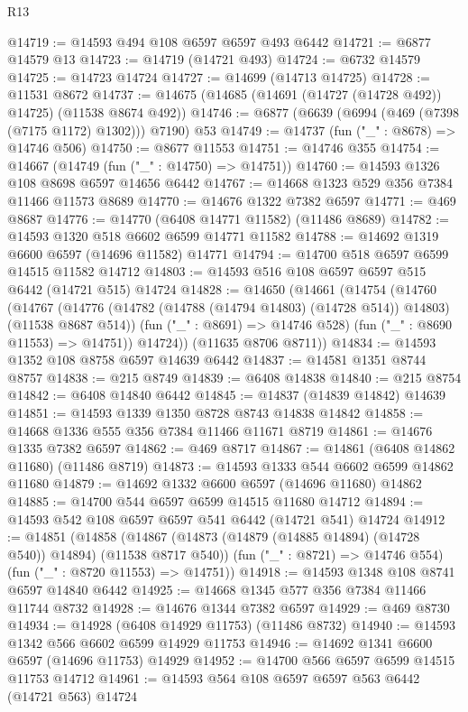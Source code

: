 \begin{lexlean}{R13}
\begin{coremodule}
@14719 := @14593 @494 @108 @6597 @6597 @493 @6442
@14721 := @6877 @14579 @13
@14723 := @14719 (@14721 @493)
@14724 := @6732 @14579
@14725 := @14723 @14724
@14727 := @14699 (@14713 @14725)
@14728 := @11531 @8672
@14737 := @14675 (@14685 (@14691 (@14727 (@14728 @492)) @14725) (@11538 @8674 @492))
@14746 := @6877 (@6639 (@6994 (@469 (@7398 (@7175 @1172) @1302))) @7190) @53
@14749 := @14737 (fun ("_" : @8678) => @14746 @506)
@14750 := @8677 @11553
@14751 := @14746 @355
@14754 := @14667 (@14749 (fun ("_" : @14750) => @14751))
@14760 := @14593 @1326 @108 @8698 @6597 @14656 @6442
@14767 := @14668 @1323 @529 @356 @7384 @11466 @11573 @8689
@14770 := @14676 @1322 @7382 @6597
@14771 := @469 @8687
@14776 := @14770 (@6408 @14771 @11582) (@11486 @8689)
@14782 := @14593 @1320 @518 @6602 @6599 @14771 @11582
@14788 := @14692 @1319 @6600 @6597 (@14696 @11582) @14771
@14794 := @14700 @518 @6597 @6599 @14515 @11582 @14712
@14803 := @14593 @516 @108 @6597 @6597 @515 @6442 (@14721 @515) @14724
@14828 := @14650
    (@14661
      (@14754
        (@14760
          (@14767
            (@14776 (@14782 (@14788 (@14794 @14803) (@14728 @514)) @14803) (@11538 @8687 @514))
            (fun ("_" : @8691) => @14746 @528)
            (fun ("_" : @8690 @11553) => @14751))
          @14724))
      (@11635 @8706 @8711))
@14834 := @14593 @1352 @108 @8758 @6597 @14639 @6442
@14837 := @14581 @1351 @8744 @8757
@14838 := @215 @8749
@14839 := @6408 @14838
@14840 := @215 @8754
@14842 := @6408 @14840 @6442
@14845 := @14837 (@14839 @14842) @14639
@14851 := @14593 @1339 @1350 @8728 @8743 @14838 @14842
@14858 := @14668 @1336 @555 @356 @7384 @11466 @11671 @8719
@14861 := @14676 @1335 @7382 @6597
@14862 := @469 @8717
@14867 := @14861 (@6408 @14862 @11680) (@11486 @8719)
@14873 := @14593 @1333 @544 @6602 @6599 @14862 @11680
@14879 := @14692 @1332 @6600 @6597 (@14696 @11680) @14862
@14885 := @14700 @544 @6597 @6599 @14515 @11680 @14712
@14894 := @14593 @542 @108 @6597 @6597 @541 @6442 (@14721 @541) @14724
@14912 := @14851
    (@14858
      (@14867 (@14873 (@14879 (@14885 @14894) (@14728 @540)) @14894) (@11538 @8717 @540))
      (fun ("_" : @8721) => @14746 @554)
      (fun ("_" : @8720 @11553) => @14751))
@14918 := @14593 @1348 @108 @8741 @6597 @14840 @6442
@14925 := @14668 @1345 @577 @356 @7384 @11466 @11744 @8732
@14928 := @14676 @1344 @7382 @6597
@14929 := @469 @8730
@14934 := @14928 (@6408 @14929 @11753) (@11486 @8732)
@14940 := @14593 @1342 @566 @6602 @6599 @14929 @11753
@14946 := @14692 @1341 @6600 @6597 (@14696 @11753) @14929
@14952 := @14700 @566 @6597 @6599 @14515 @11753 @14712
@14961 := @14593 @564 @108 @6597 @6597 @563 @6442 (@14721 @563) @14724

\end{coremodule}
\end{lexlean}
